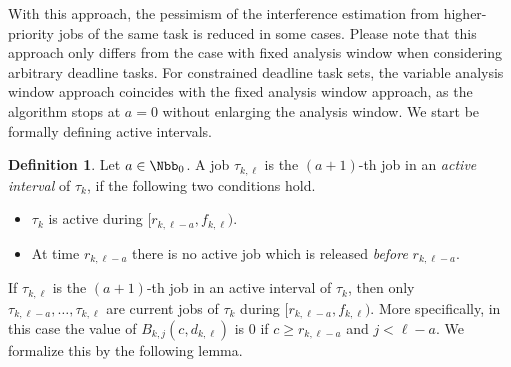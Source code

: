 \documentclass[conference]{IEEEtran}
\theoremstyle{definition}
\newtheorem{defn}[thm]{Definition}
\theoremstyle{remark}
\begin{document}
	With this approach, the pessimism of the interference estimation from higher-priority jobs of the same task is reduced in some cases.
	Please note that this approach only differs from the case with fixed analysis window when considering arbitrary deadline tasks.
	For constrained deadline task sets, the variable analysis window approach coincides with the fixed analysis window approach, as the algorithm stops at $a=0$ without enlarging the analysis window.
	We start be formally defining active intervals.
	
	\begin{defn}\label{def:active_int}
		Let $a\in \Nbb_0$.
		A job $\tau_{k,\ell}$ is the $(a+1)$-th job in an \emph{active interval} of $\tau_k$, if the following two conditions hold.
		\begin{itemize}
			\item $\tau_k$ is active during $[r_{k,\ell-a},f_{k,\ell})$.
			\item At time $r_{k,\ell-a}$ there is no active job which is released \emph{before} $r_{k,\ell-a}$.
		\end{itemize}
	\end{defn}

	If $\tau_{k,\ell}$ is the $(a+1)$-th job in an active interval of $\tau_k$, then only $\tau_{k,\ell-a}, \dots, \tau_{k,\ell}$ are current jobs of $\tau_k$ during $[r_{k,\ell-a},f_{k,\ell})$.
	More specifically, in this case the value of $B_{k,j}(c,d_{k,\ell})$ is $0$ if $c \geq r_{k,\ell-a}$ and $j<\ell-a$. 
	We formalize this by the following lemma.
	
\end{document}
